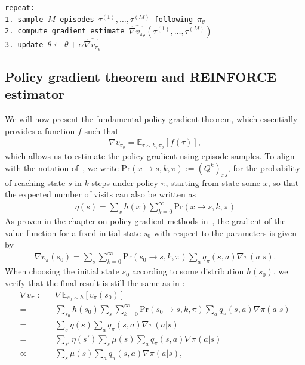 \documentclass[a4paper]{article}
\begin{document}
\vspace{1em}
\noindent
\texttt{repeat:\\
1. sample $M$ episodes $\tau^{(1)}, \dots, \tau^{(M)}$ following $\pi_{\theta}$\\
2. compute gradient estimate $\widehat{\nabla v_{\pi_{\theta}}}(\tau^{(1)}, \dots, \tau^{(M)})$\\
3. update $\theta \leftarrow \theta + \alpha \widehat{\nabla v_{\pi_{\theta}}}$
}

\subsection{Policy gradient theorem and REINFORCE estimator}

We will now present the fundamental policy gradient theorem, which essentially
provides a function $f$ such that
\begin{align*}
  \nabla v_{\pi_{\theta}} = \mathbb{E}_{\tau \sim h,\pi_{\theta}}[f(\tau)] ,
\end{align*}
which allows us to estimate the policy gradient using episode samples.
%
To align with the notation
of~\cite{suttonReinforcementLearningIntroduction2018}, we write
$\mathrm{Pr}(x \rightarrow s, k, \pi) := (Q^{k})_{xs}$, for the probability of
reaching state $s$ in $k$ steps under policy $\pi$, starting from state some
$x$, so that the expected number of visits can also be written as
\begin{align*}
  \eta(s) = \sum_{x} h(x) \sum_{k=0}^{\infty} \mathrm{Pr}(x \rightarrow s, k, \pi)
\end{align*}
%
As proven in the chapter on policy gradient methods
in~\cite{suttonReinforcementLearningIntroduction2018}, the gradient of the value
function for a fixed initial state $s_0$ with respect to the parameters is given
by
\begin{align}
  \nabla v_{\pi}(s_{0}) = \sum_{s} \sum_{k=0}^{\infty} \mathrm{Pr}(s_{0} \rightarrow s, k, \pi) \sum_{a} q_{\pi}(s,a) \nabla \pi(a|s) .
\end{align}
When choosing the initial state $s_{0}$ according to some distribution
$h(s_{0})$, we verify that the final result is still the same as in
\cite{suttonReinforcementLearningIntroduction2018}:
\begin{subequations}
\begin{align}
  \nabla v_{\pi} :=& \nabla \mathbb{E}_{s_{0} \sim h}[v_{\pi}(s_{0})] \\
  =& \sum_{s_{0}} h(s_{0}) \sum_{s} \sum_{k=0}^{\infty} \mathrm{Pr}(s_{0} \rightarrow s, k, \pi) \sum_{a} q_{\pi}(s,a) \nabla \pi(a|s) \\
  =& \sum_{s} \eta(s) \sum_{a} q_{\pi}(s,a) \nabla \pi(a|s) \\
  =& \sum_{s'} \eta(s') \sum_{s} \mu(s) \sum_{a} q_{\pi}(s,a) \nabla \pi(a|s) \\
  \propto& \sum_{s} \mu(s) \sum_{a} q_{\pi}(s,a) \nabla \pi(a|s) ,
\end{align}
\end{subequations}
\end{document}
